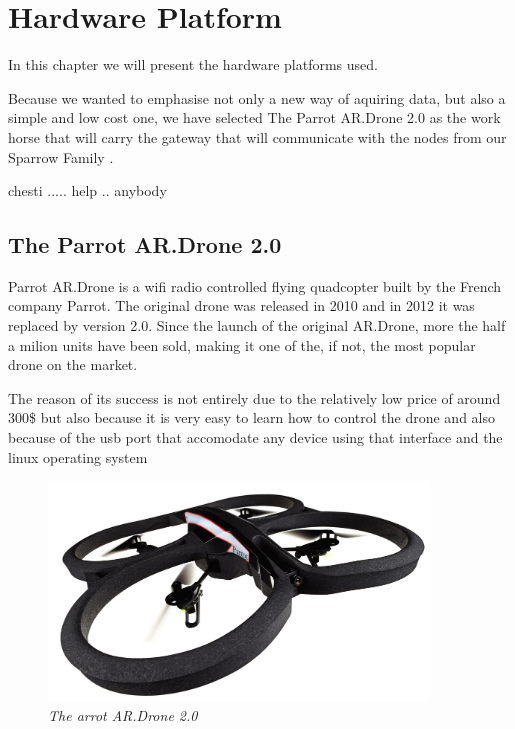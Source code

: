 \normalfont\normalsize
\chapter{Hardware Platform}

In this chapter we will present the hardware platforms used. 


Because we wanted to emphasise not only a new way of aquiring data, but also a simple and low cost one, we have selected The Parrot AR.Drone 2.0 as the work horse that will carry the gateway that will communicate with the nodes from our Sparrow Family . 


chesti ..... help .. anybody

 

\section{The Parrot AR.Drone 2.0}

Parrot AR.Drone is a wifi radio controlled flying quadcopter built by the French company Parrot.
The original drone was released in 2010 and in 2012 it was replaced by version 2.0. Since the launch of the original AR.Drone, more the half a milion units have been sold, making it one of the, if not, the most popular drone on the market.

The reason of its success is not entirely due to the relatively low price of around 300\$ but also because it is very easy to learn how to control the drone and also because of the usb port that accomodate any device using that interface and the linux operating system


\begin{figure}[ht]
\begin{center}
\includegraphics[width=0.9\textwidth]{hw_platform/drone.jpg}
\end{center}
\caption{\small \itshape{The arrot AR.Drone 2.0}}
\end{figure}


